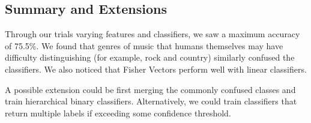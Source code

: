 \subsection{Summary and Extensions}
Through our trials varying features and classifiers, we saw a maximum accuracy of 75.5\%. We found that genres of music that humans themselves may have difficulty distinguishing (for example, rock and country) similarly confused the classifiers. We also noticed that Fisher Vectors perform well with linear classifiers. 

A possible extension could be first merging the commonly confused classes and train hierarchical binary classifiers. Alternatively, we could train classifiers that return multiple labels if exceeding some confidence threshold.